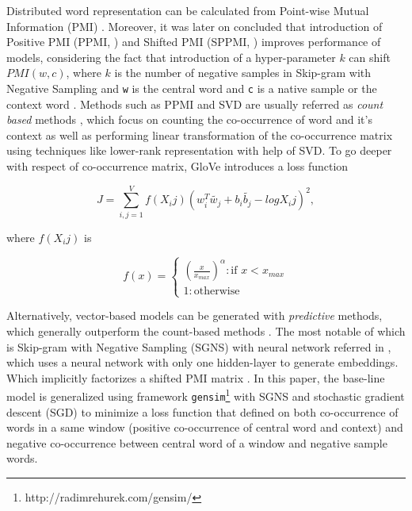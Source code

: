 Distributed word representation can be calculated from Point-wise Mutual Information (PMI) \cite{church1990word}. Moreover, it was later on concluded that introduction of Positive PMI (PPMI, \cite{bullinaria2007extracting}) and Shifted PMI (SPPMI, \cite{goldberg2014word2vec}) improves performance of models, considering the fact that introduction of a hyper-parameter $k$ can shift $PMI(w, c)$, where $k$ is the number of negative samples in Skip-gram with Negative Sampling and \verb|w| is the central word and \verb|c| is a native sample or the context word \cite{levy2014neural}. Methods such as PPMI and SVD are usually referred as \emph{count based} methods \cite{levy2015improving}, which focus on counting the co-occurrence of word and it's context as well as performing linear transformation of the co-occurrence matrix using techniques like lower-rank representation with help of SVD. To go deeper with respect of co-occurrence matrix, GloVe \cite{Pennington2014glove} introduces a loss function

\begin{equation}
J=\sum_{i,j=1}^{V}f(X_ij)(w_i^T\tilde{w_j}+b_i\tilde{b_j}-logX_ij)^2,
\end{equation}

where $f(X_ij)$ is

\[f(x)=\begin{cases}
    (\frac{x}{x_{max}})^\alpha : \text{if }x<x_{max}\\
    1 : \text{otherwise}
    \end{cases}
\]

Alternatively, vector-based models can be generated with \emph{predictive} methods, which generally outperform the count-based methods \cite{levy2015improving}. The most notable of which is Skip-gram with Negative Sampling (SGNS) with neural network referred in \cite{mikolov2013distributed}, which uses a neural network with only one hidden-layer to generate embeddings. Which implicitly factorizes a shifted PMI matrix \cite{levy2014neural}. In this paper, the base-line model is generalized using framework \verb|gensim|\footnote{http://radimrehurek.com/gensim/} with SGNS and stochastic gradient descent (SGD) to minimize a loss function that defined on both co-occurrence of words in a same window (positive co-occurrence of central word and context) and negative co-occurrence between central word of a window and negative sample words. 
